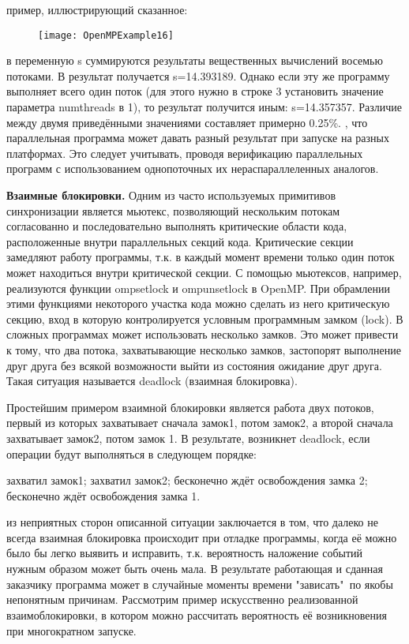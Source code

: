 {	 пример, иллюстрирующий сказанное:
	\begin{figure}[H]
		\texttt{[image: OpenMPExample16]}
	\end{figure}
	 в переменную s суммируются результаты вещественных вычислений восемью потоками. В результат получается s=14.393189. Однако если эту же программу выполняет всего один поток (для этого нужно в строке 3 установить значение параметра num\textunderscore threads в 1), то результат получится иным: s=14.357357. Различие между двумя приведёнными значениями составляет примерно 0.25\%. 
	, что параллельная программа может давать разный результат при запуске на разных платформах. Это следует учитывать, проводя верификацию параллельных программ с использованием однопоточных их нераспараллеленных аналогов.
	\par\textbf{Взаимные блокировки.} Одним из часто используемых примитивов синхронизации является мьютекс, позволяющий нескольким потокам согласованно и последовательно выполнять критические области кода, расположенные внутри параллельных секций кода. Критические секции замедляют работу программы, т.к. в каждый момент времени только один поток может находиться внутри критической секции. С помощью мьютексов, например, реализуются функции omp\textunderscore set\textunderscore lock и omp\textunderscore unset\textunderscore lock в OpenMP. При обрамлении этими функциями некоторого участка кода можно сделать из него критическую секцию, вход в которую контролируется условным программным замком (lock). В сложных программах может использовать несколько замков. Это может привести к тому, что два потока, захватывающие несколько замков, застопорят выполнение друг друга без всякой возможности выйти из состояния ожидание друг друга. Такая ситуация называется deadlock (взаимная блокировка).
	\par Простейшим примером взаимной блокировки является работа двух потоков, первый из которых захватывает сначала замок1, потом замок2, а второй сначала захватывает замок2, потом замок 1. В результате, возникнет deadlock, если операции будут выполняться в следующем порядке: 
	\begin{itemize}
		 захватил замок1;
		 захватил замок2;
		 бесконечно ждёт освобождения замка 2;
		 бесконечно ждёт освобождения замка 1.
	\end{itemize}
	 из неприятных сторон описанной ситуации заключается в том, что далеко не всегда взаимная блокировка происходит при отладке программы, когда её можно было бы легко выявить и исправить, т.к. вероятность наложение событий нужным образом может быть очень мала. В результате работающая и сданная заказчику программа может в случайные моменты времени "зависать"\verb+ +по якобы непонятным причинам. Рассмотрим пример искусственно реализованной взаимоблокировки, в котором можно рассчитать вероятность её возникновения при многократном запуске.
}
